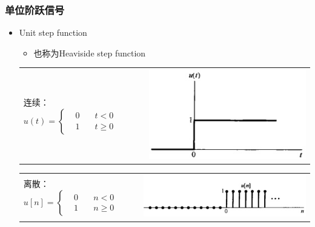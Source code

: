 \documentclass[CJKutf8,xcolor=pdftex,dvipsnames,table]{beamer}
\begin{document}
\begin{CJK*}{UTF8}{song}
  \begin{frame}
    \frametitle{单位阶跃信号}
    \begin{itemize}
    \item Unit step function
    \begin{itemize}
    \item 也称为Heaviside step function
    \end{itemize}    
    
	\begin{tabular}{ll}
	\raisebox{-.5\height}

    连续：
    \begin{math}
u(t) = 
\left\{
    \begin {aligned}
         & 0 \quad & t < 0 \\
         & 1 \quad & t \geq 0                  
    \end{aligned}
\right.
	\end{math}

&
    \includegraphics[valign=m,scale=.3]{cunitstepfunction}    \\
    \end{tabular}    

	\begin{tabular}{ll}
	\raisebox{-.5\height}

    离散：
    \begin{math}
u[n] = 
\left\{
    \begin {aligned}
         & 0 \quad & n < 0 \\
         & 1 \quad & n \geq 0                  
    \end{aligned}
\right.
	\end{math}

&
    \includegraphics[valign=m,scale=.4]{dunitstepfunction}    \\
    \end{tabular}   


\end{itemize}
\end{frame}
\end{CJK*}
\end{document}
